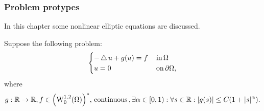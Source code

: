 \documentclass{article}
\begin{document}
\subsubsection{Problem protypes}
\label{sec:prototypes}

In this chapter some nonlinear elliptic equations are discussed.

\begin{example}
	Suppose the following problem: 
	\[
		\begin{cases}
			-\operatorname{\bigtriangleup} u + g(u) = f & \, \text{in} \, \Omega\\
			u = 0 & \, \text{on} \, \partial \Omega,
		\end{cases}
	\]
	where
	\[
		g: \R \to \R, f \in \qty(\WkpzeroSet[1][2]{\Omega})^{*}, \, \text{continuous} \,, \exists \alpha \in [0,1): \forall s \in \R: |g(s)|\leq C\qty(1+|s|^{\alpha}).
	\]


\end{example}
\end{document}

